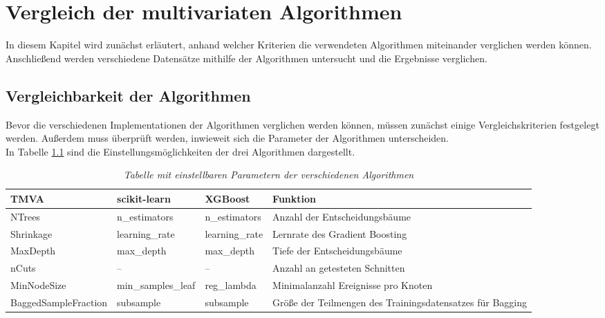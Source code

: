 \chapter{Vergleich der multivariaten Algorithmen}
\label{ch:vergleich}

{}

In diesem Kapitel wird zun\"achst erl\"autert, anhand welcher Kriterien die verwendeten Algorithmen miteinander verglichen werden k\"onnen. Anschlie\ss end werden verschiedene Datens\"atze mithilfe der Algorithmen untersucht und die Ergebnisse verglichen.

\section{Vergleichbarkeit der Algorithmen}
\label{ch:Vergleich:sec:Vergleichbarkeit}

Bevor die verschiedenen Implementationen der Algorithmen verglichen werden k\"onnen, m\"ussen zun\"achst einige Vergleichskriterien festgelegt werden. Au\ss erdem muss \"uberpr\"uft werden, inwieweit sich die Parameter der Algorithmen unterscheiden.\\
In Tabelle \ref{tab:parameter} sind die Einstellungsm\"oglichkeiten der drei Algorithmen dargestellt.

\begin{table}[hhh]\parbox{12cm}{
  \caption[Algorithmenparameter]{\it Tabelle mit einstellbaren Parametern der verschiedenen Algorithmen}%
  }\label{tab:parameter}
  \begin{center}
  \begin{tabular}{p{3.75cm}p{2.75cm}p{2.25cm}p{4.5cm}}
  \hline
  {\bf TMVA} & {\bf scikit-learn} & {\bf XGBoost} & {\bf Funktion} \\
  \hline \hline
     NTrees	& n\_estimators & n\_estimators & Anzahl der Entscheidungsb\"aume \\
     Shrinkage	& learning\_rate & learning\_rate & Lernrate des Gradient Boosting \\
     MaxDepth & max\_depth & max\_depth & Tiefe der Entscheidungsb\"aume\\
     nCuts & -- & -- & Anzahl an getesteten Schnitten\\ 
  	 MinNodeSize & min\_samples\_leaf & reg\_lambda & Minimalanzahl Ereignisse pro Knoten\\ 
  	 BaggedSampleFraction & subsample & subsample & Gr\"o\ss e der Teilmengen des Trainingsdatensatzes f\"ur Bagging\\                     
  \hline
  \end{tabular}
  \end{center}
\end{table}

